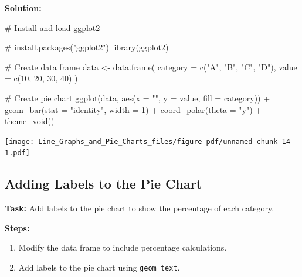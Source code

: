 \documentclass[
  letterpaper,
  DIV=11,
  numbers=noendperiod]{scrreprt}
\newenvironment{Shaded}{\begin{snugshade}}{\end{snugshade}}
\newcommand{\AttributeTok}[1]{\textcolor[rgb]{0.40,0.45,0.13}{#1}}
\newcommand{\CommentTok}[1]{\textcolor[rgb]{0.37,0.37,0.37}{#1}}
\newcommand{\DecValTok}[1]{\textcolor[rgb]{0.68,0.00,0.00}{#1}}
\newcommand{\FunctionTok}[1]{\textcolor[rgb]{0.28,0.35,0.67}{#1}}
\newcommand{\NormalTok}[1]{\textcolor[rgb]{0.00,0.23,0.31}{#1}}
\newcommand{\OtherTok}[1]{\textcolor[rgb]{0.00,0.23,0.31}{#1}}
\newcommand{\SpecialCharTok}[1]{\textcolor[rgb]{0.37,0.37,0.37}{#1}}
\newcommand{\StringTok}[1]{\textcolor[rgb]{0.13,0.47,0.30}{#1}}
\providecommand{\tightlist}{%
  \setlength{\itemsep}{0pt}\setlength{\parskip}{0pt}}\usepackage{longtable,booktabs,array}
\begin{document}
\textbf{Solution:}

\begin{Shaded}
\begin{Highlighting}[]
\CommentTok{\# Install and load ggplot2}

\CommentTok{\# install.packages("ggplot2")}
\FunctionTok{library}\NormalTok{(ggplot2)}

\CommentTok{\# Create data frame}
\NormalTok{data }\OtherTok{\textless{}{-}} \FunctionTok{data.frame}\NormalTok{(}
  \AttributeTok{category =} \FunctionTok{c}\NormalTok{(}\StringTok{"A"}\NormalTok{, }\StringTok{"B"}\NormalTok{, }\StringTok{"C"}\NormalTok{, }\StringTok{"D"}\NormalTok{),}
  \AttributeTok{value =} \FunctionTok{c}\NormalTok{(}\DecValTok{10}\NormalTok{, }\DecValTok{20}\NormalTok{, }\DecValTok{30}\NormalTok{, }\DecValTok{40}\NormalTok{)}
\NormalTok{)}

\CommentTok{\# Create pie chart}
\FunctionTok{ggplot}\NormalTok{(data, }\FunctionTok{aes}\NormalTok{(}\AttributeTok{x =} \StringTok{""}\NormalTok{, }\AttributeTok{y =}\NormalTok{ value, }\AttributeTok{fill =}\NormalTok{ category)) }\SpecialCharTok{+}
  \FunctionTok{geom\_bar}\NormalTok{(}\AttributeTok{stat =} \StringTok{"identity"}\NormalTok{, }\AttributeTok{width =} \DecValTok{1}\NormalTok{) }\SpecialCharTok{+}
  \FunctionTok{coord\_polar}\NormalTok{(}\AttributeTok{theta =} \StringTok{"y"}\NormalTok{) }\SpecialCharTok{+}
  \FunctionTok{theme\_void}\NormalTok{()}
\end{Highlighting}
\end{Shaded}

\texttt{[image: Line\_Graphs\_and\_Pie\_Charts\_files/figure-pdf/unnamed-chunk-14-1.pdf]}

\subsection*{Adding Labels to the Pie
Chart}\label{adding-labels-to-the-pie-chart}

\textbf{Task:} Add labels to the pie chart to show the percentage of
each category.

\textbf{Steps:}

\begin{enumerate}
\def\labelenumi{\arabic{enumi}.}
\tightlist
\item
  Modify the data frame to include percentage calculations.
\item
  Add labels to the pie chart using \texttt{geom\_text}.
\end{enumerate}
\end{document}

